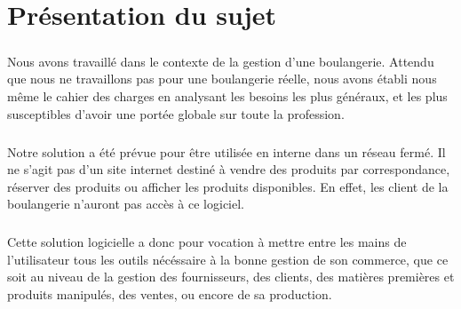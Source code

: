 \chapter{Présentation du sujet}

\paragraph{}
    Nous avons travaillé dans le contexte de la gestion d'une boulangerie.
    Attendu que nous ne travaillons pas pour une boulangerie réelle, nous avons
    établi nous même le cahier des charges en analysant les besoins les plus
    généraux, et les plus susceptibles d'avoir une portée globale sur toute
    la profession.
\paragraph{}
    Notre solution a été prévue pour être utilisée en interne dans un réseau
    fermé. Il ne s'agit pas d'un site internet destiné à vendre des
    produits par correspondance, réserver des produits ou afficher les produits
    disponibles. En effet, les client de la boulangerie n'auront pas accès à ce
    logiciel.
\paragraph{}
    Cette solution logicielle a donc pour vocation à mettre entre les mains de 
    l'utilisateur tous les outils nécéssaire à la bonne gestion de son
    commerce, que ce soit au niveau de la gestion des fournisseurs, des
    clients, des matières premières et produits manipulés, des ventes,
    ou encore de sa production.